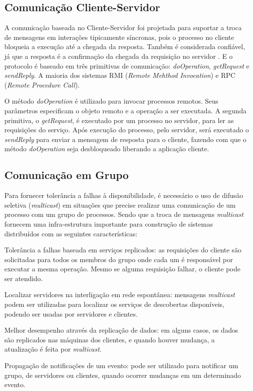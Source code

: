 \documentclass[
	12pt,				%
	oneside,			%
	a4paper,			%
	english,			%
	brazil				%
	]{abntex2ppgsi}
\begin{document}
\subsection{Comunicação Cliente-Servidor}

A comunicação baseada no Cliente-Servidor foi projetada para suportar a troca de mensagens em interações tipicamente síncronas, pois o processo no cliente bloqueia a execução até a chegada da resposta. Também é considerada confiável, já que a resposta é a confirmação da chegada da requisição no servidor \cite{coulouris2013sistemas}. E o protocolo é baseado em três primitivas de comunicação: \textit{doOperation}, \textit{getRequest} e \textit{sendReply}. A maioria dos sistemas RMI (\textit{Remote Mehthod Invocation}) e RPC (\textit{Remote Procedure Call}).

O método \textit{doOperation} é utilizado para invocar processos remotos. Seus parâmetros especificam  o objeto remoto e a operação a ser executada. A segunda primitiva, o \textit{getRequest}, é executado por um processo no servidor, para ler as requisições do serviço. Após execução do processo, pelo servidor, será executado o \textit{sendReply} para enviar a mensagem de resposta para o cliente, fazendo com que o método \textit{doOperation} seja desbloqueado liberando a aplicação cliente.

\subsection{Comunicação em Grupo}

Para fornecer tolerância a falhas à disponibilidade, é necessário o uso de difusão seletiva (\textit{multicast}) em situações que precise realizar uma comunicação de um processo com um grupo de processos. Sendo que a troca de mensagens \textit{multicast} fornecem uma infra-estrutura importante para construção de sistemas distribuídos com as seguintes características:

\begin{itemize*}
	\item{Tolerância a falhas baseada em serviços replicados: as requisições do cliente são solicitadas para todos os membros do grupo onde cada um é responsável por executar a mesma operação. Mesmo se alguma requisição falhar, o cliente pode ser atendido.}
	\item{Localizar servidores na interligação em rede espontânea: mensagens \textit{multicast} podem ser utilizadas para localizar os serviços de descobertas disponíveis, podendo ser usadas por servidores e clientes.}
	\item{Melhor desempenho através da replicação de dados: em alguns casos, os dados são replicados nas máquinas dos clientes, e quando houver mudança, a atualização é feita por \textit{multicast}.}
	\item{Propagação de notificações de um evento: pode ser utilizado para notificar um grupo, de servidores ou clientes, quando ocorrer mudanças em um determinado evento.}
\end{itemize*}
\end{document}
